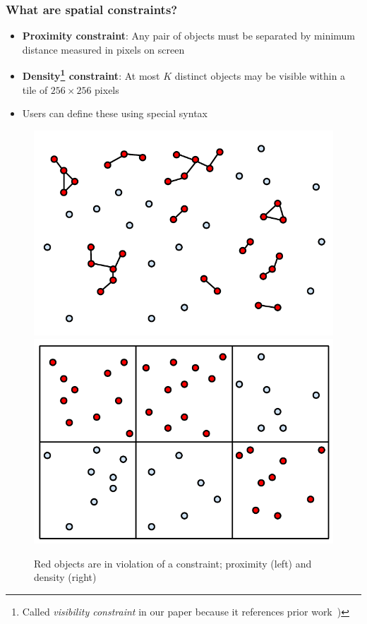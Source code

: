 \documentclass{beamer}
\begin{document}
\frame
{
  \frametitle{What are spatial constraints?}
  \begin{itemize}
  \item \textbf{Proximity constraint}: Any pair of objects must be separated by minimum distance measured in pixels on screen
  \item \textbf{Density\footnote{Called \emph{visibility constraint} in our paper because it references prior work~\cite{fusiontables})} constraint}: At most $K$ distinct objects may be visible within a tile of $256 \times 256$ pixels
  \item Users can define these using special syntax
  \end{itemize}
  \begin{center}
  \begin{figure}
  \label{fig:contraints}
  \includegraphics[scale=0.4]{figs/cvl-proximity.pdf} \includegraphics[scale=0.4]{figs/cvl-visibility.pdf}
  \caption{Red objects are in violation of a constraint; proximity (left) and density (right)}
  \end{figure}
  \end{center}
}
\end{document}
